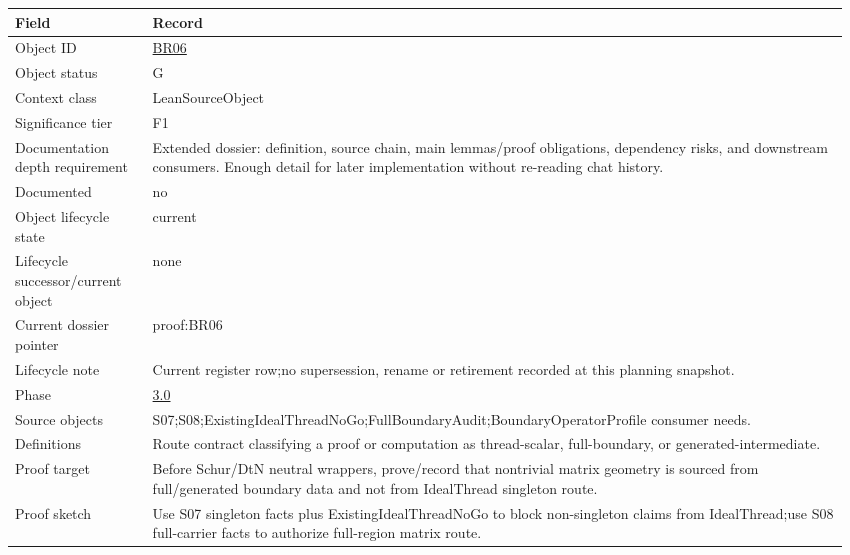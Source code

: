 \begin{longtable}{L{0.16\linewidth} L{0.81\linewidth}}
\hline
\textbf{Field} & \textbf{Record}\\
\hline
Object ID & \hyperlink{object-row-BR06}{BR06}\\
\hline\addlinespace[0.20em]
Object status & G\\
\hline\addlinespace[0.20em]
Context class & LeanSourceObject\\
\hline\addlinespace[0.20em]
Significance tier & F1\\
\hline\addlinespace[0.20em]
Documentation depth requirement & Extended dossier: definition, source chain, main lemmas/\allowbreak{}proof obligations, dependency risks, and downstream consumers. Enough detail for later implementation without re-reading chat history.\\
\hline\addlinespace[0.20em]
Documented & no\\
\hline\addlinespace[0.20em]
Object lifecycle state & current\\
\hline\addlinespace[0.20em]
Lifecycle successor/\allowbreak{}current object & none\\
\hline\addlinespace[0.20em]
Current dossier pointer & proof:BR06\\
\hline\addlinespace[0.20em]
Lifecycle note & Current register row;\newline no supersession, rename or retirement recorded at this planning snapshot.\\
\hline\addlinespace[0.20em]
Phase & \hyperlink{phase-row-3-0}{3.0}\\
\hline\addlinespace[0.20em]
Source objects & S07;\newline S08;\newline ExistingIdealThreadNoGo;\newline FullBoundaryAudit;\newline BoundaryOperatorProfile consumer needs.\\
\hline\addlinespace[0.20em]
Definitions & Route contract classifying a proof or computation as thread-scalar, full-boundary, or generated-intermediate.\\
\hline\addlinespace[0.20em]
Proof target & Before Schur/\allowbreak{}DtN neutral wrappers, prove/\allowbreak{}record that nontrivial matrix geometry is sourced from full/\allowbreak{}generated boundary data and not from IdealThread singleton route.\\
\hline\addlinespace[0.20em]
Proof sketch & Use S07 singleton facts plus ExistingIdealThreadNoGo to block non-singleton claims from IdealThread;\newline use S08 full-carrier facts to authorize full-region matrix route.\\

\end{longtable}
